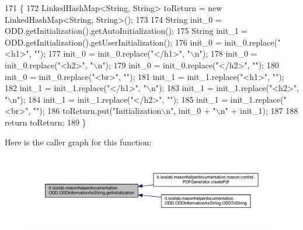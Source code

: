 \begin{DoxyCode}
171                                                                    \{
172         LinkedHashMap<String, String> toReturn = \textcolor{keyword}{new} LinkedHashMap<String, String>();
173 
174         String init\_0 = ODD.getInitialization().getAutoInitialization();
175         String init\_1 = ODD.getInitialization().getUserInitialization();
176         init\_0 = init\_0.replace(\textcolor{stringliteral}{"<h1>"}, \textcolor{stringliteral}{""});
177         init\_0 = init\_0.replace(\textcolor{stringliteral}{"</h1>"}, \textcolor{stringliteral}{"\(\backslash\)n"});
178         init\_0 = init\_0.replace(\textcolor{stringliteral}{"<h2>"}, \textcolor{stringliteral}{"\(\backslash\)n"});
179         init\_0 = init\_0.replace(\textcolor{stringliteral}{"</h2>"}, \textcolor{stringliteral}{""});
180         init\_0 = init\_0.replace(\textcolor{stringliteral}{"<br>"}, \textcolor{stringliteral}{""});
181         init\_1 = init\_1.replace(\textcolor{stringliteral}{"<h1>"}, \textcolor{stringliteral}{""});
182         init\_1 = init\_1.replace(\textcolor{stringliteral}{"</h1>"}, \textcolor{stringliteral}{"\(\backslash\)n"});
183         init\_1 = init\_1.replace(\textcolor{stringliteral}{"<h2>"}, \textcolor{stringliteral}{"\(\backslash\)n"});
184         init\_1 = init\_1.replace(\textcolor{stringliteral}{"</h2>"}, \textcolor{stringliteral}{""});
185         init\_1 = init\_1.replace(\textcolor{stringliteral}{"<br>"}, \textcolor{stringliteral}{""});
186         toReturn.put(\textcolor{stringliteral}{"Initialization\(\backslash\)n"}, init\_0 + \textcolor{stringliteral}{"\(\backslash\)n"} + init\_1);
187         
188         \textcolor{keywordflow}{return} toReturn;
189     \}
\end{DoxyCode}


Here is the caller graph for this function\-:
\nopagebreak
\begin{figure}[H]
\begin{center}
\leavevmode
\includegraphics[width=350pt]{classit_1_1isislab_1_1masonhelperdocumentation_1_1_o_d_d_1_1_o_d_d_information_as_string_add26c98c3f84cb1c6f5ff39db3256842_icgraph}
\end{center}
\end{figure}


